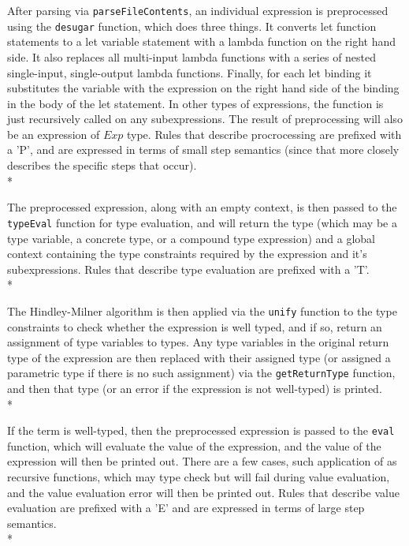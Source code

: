 \documentclass[11pt]{article}
\begin{document}
After parsing via \verb|parseFileContents|, an individual expression is preprocessed using the \verb|desugar| function, which does three things.  It converts let function statements to a let variable statement with a lambda function on the right hand side. It also replaces all multi-input lambda functions with a series of nested single-input, single-output lambda functions.  Finally, for each let binding it substitutes the variable with the expression on the right hand side of the binding in the body of the let statement. In other types of expressions, the function is just recursively called on any subexpressions. The result of preprocessing will also be an expression of $Exp$ type. Rules that describe procrocessing are prefixed with a 'P', and are expressed in terms of small step semantics (since that more closely describes the specific steps that occur).\\* 

The preprocessed expression, along with an empty context, is then passed to the \verb|typeEval| function for type evaluation, and will return the type (which may be a type variable, a concrete type, or a compound type expression) and a global context containing the type constraints required by the expression and it's subexpressions. Rules that describe type evaluation are prefixed with a 'T'.\\*

The Hindley-Milner algorithm is then applied via the \verb|unify| function to the type constraints to check whether the expression is well typed, and if so, return an assignment of type variables to types.  Any type variables in the original return type of the  
expression are then replaced with their assigned type (or assigned a parametric type if there is no such assignment) via the \verb|getReturnType| function, and then that type (or an error if the expression is not well-typed) is printed.\\* 

If the term is well-typed, then the preprocessed expression is passed to the \verb|eval| function, which will evaluate the value of the expression, and the value of the expression will then be printed out. There are a few cases, such application of as recursive functions, which may type check but will fail during value evaluation, and the value evaluation error will then be printed out. Rules that describe value evaluation are prefixed with a 'E' and are expressed in terms of large step semantics.\\*
\end{document}

